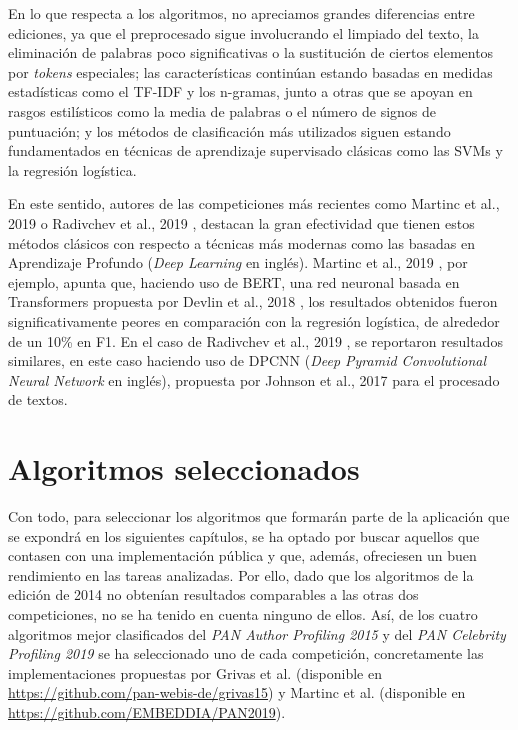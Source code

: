 \bigskip
En lo que respecta a los algoritmos, no apreciamos grandes diferencias entre ediciones, ya que el preprocesado sigue involucrando
el limpiado del texto, la eliminación de palabras poco significativas o la sustitución de ciertos elementos por \textit{tokens} especiales;
las características continúan estando basadas en medidas estadísticas como el TF-IDF y los n-gramas, junto
a otras que se apoyan en rasgos estilísticos como la media de palabras o el número de signos de puntuación; y los métodos de clasificación más utilizados
siguen estando fundamentados en técnicas de aprendizaje supervisado clásicas como las SVMs y la regresión logística.

\bigskip
En este sentido, autores de las competiciones más recientes como Martinc et al., 2019 \cite{martinc2019hot} o Radivchev et al., 2019 \cite{radivchev2019celebrity}, destacan
la gran efectividad que tienen estos métodos clásicos
con respecto a técnicas más modernas como las basadas en Aprendizaje Profundo (\textit{Deep Learning} en inglés). Martinc et al., 2019 \cite{martinc2019hot}, por ejemplo,
apunta que, haciendo uso de BERT, una red neuronal basada en Transformers propuesta por Devlin et al., 2018 \cite{devlin2018bert},
los resultados obtenidos fueron significativamente peores en comparación con la regresión logística, de alrededor de un 10\% en F1. En el caso
de Radivchev et al., 2019 \cite{radivchev2019celebrity}, se reportaron resultados similares, en este caso haciendo uso de DPCNN (\textit{Deep Pyramid Convolutional Neural Network} en inglés),
propuesta por Johnson et al., 2017 \cite{johnson2017deep} para el procesado de textos.

\section{Algoritmos seleccionados}
\label{sec:algoritmos_seleccionados}

Con todo, para seleccionar los algoritmos que formarán parte de la aplicación que se expondrá en los siguientes capítulos, se ha optado
por buscar aquellos que contasen con una implementación pública y que, además, ofreciesen un buen rendimiento en las tareas analizadas.
Por ello, dado que los algoritmos de la edición de 2014 no obtenían resultados comparables a las otras dos competiciones,
no se ha tenido en cuenta ninguno de ellos. Así, de los cuatro algoritmos mejor clasificados del \textit{PAN Author Profiling 2015} y
del \textit{PAN Celebrity Profiling 2019} se ha seleccionado uno de cada competición, concretamente las implementaciones propuestas por
Grivas et al. \cite{grivas2015author} (disponible en \url{https://github.com/pan-webis-de/grivas15})
y Martinc et al. \cite{martinc2019hot} (disponible en \url{https://github.com/EMBEDDIA/PAN2019}).

